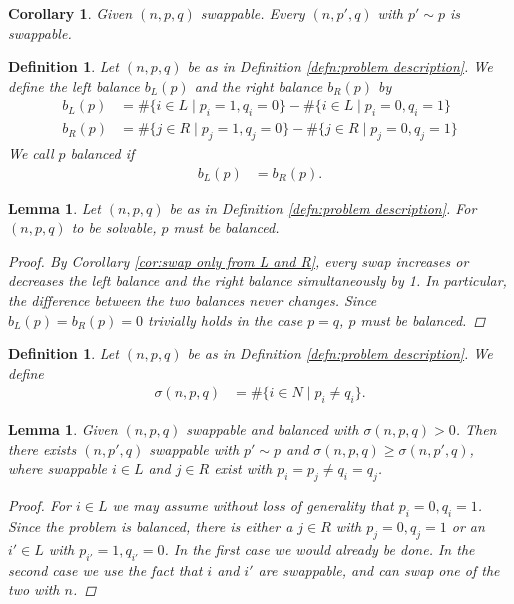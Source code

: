 \documentclass[12pt]{article}
\newtheorem{defn}[thm]{Definition}
\newtheorem{lem}[thm]{Lemma}
\newtheorem{cor}[thm]{Corollary}
\begin{document}
\begin{cor}
Given $(n, p, q)$ swappable. Every $(n, p', q)$ with $p'\sim p$ is swappable.
\label{cor:swappable once swappable always}
\end{cor}


\begin{defn}
Let $(n, p, q)$ be as in Definition \ref{defn:problem description}. We define the left balance $b_L(p)$ and the right balance $b_R(p)$ by
\begin{align*}
b_L(p) &=\#\{i\in L \mid p_i=1, q_i=0\}
-
\#\{i\in L \mid p_i=0, q_i=1\}
\\
b_R(p) &= \#\{j\in R \mid p_j=1, q_j=0\}
-
\#\{j\in R \mid p_j=0, q_j=1\}
\end{align*}
We call $p$ balanced if
\begin{align*}
b_L(p) &= b_R(p).
\end{align*}
\end{defn}


\begin{lem}
 Let $(n, p, q)$ be as in Definition \ref{defn:problem description}. For $(n, p, q)$ to be solvable, $p$ must be balanced.
\begin{proof}
By Corollary \ref{cor:swap only from L and R}, every swap increases or decreases the left balance and the right balance simultaneously by 1. In particular, the difference between the two balances never changes. Since $b_L(p)=b_R(p)=0$ trivially holds in the case $p=q$, $p$ must be balanced.
\end{proof}
\label{lem_balanced}
\end{lem}

\begin{defn}
Let $(n, p, q)$ be as in Definition \ref{defn:problem description}. We define
\begin{align*}
\sigma(n, p, q) 
&=\#\{i\in N \mid p_i\neq q_i\}.
\end{align*}
\end{defn}

\begin{lem}
Given $(n, p, q)$ swappable and balanced with $\sigma(n, p, q)>0$. Then there exists $(n, p', q)$ swappable with $p'\sim p$ and $\sigma(n, p, q)\geq\sigma(n, p', q)$, where swappable $i\in L$ and $j\in R$ exist with $p_i=p_j\neq q_i=q_j$.
\begin{proof}
 For $i\in L$ we may assume without loss of generality that $p_i=0, q_i=1$.
 Since the problem is balanced, there is either a $j\in R$ with $p_j=0, q_j=1$ or an $i'\in L$ with $p_{i'}=1, q_{i'}=0$. In the first case we would already be done. In the second case we use the fact that $i$ and $i'$ are swappable, and can swap one of the two with $n$.
\end{proof}
\label{lem:swap on both sides}
\end{lem}
\end{document}

